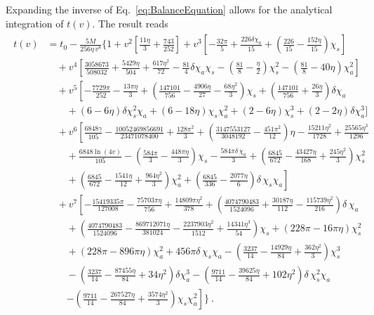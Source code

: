 Expanding the inverse of Eq.~\eqref{eq:BalanceEquation} allows for
the analytical integration of $t(v)$. The result reads
{\footnotesize
\begin{align} \label{eq:T2time}
\begin{split}
 t(v) &=  t_0 -  \frac{5M}{256 \eta \, v^8} \Bigg \{ 1 + v^2 \left[
\frac{11 \eta }{3}+\frac{743}{252} \right] + 
v^3 \left[ -\frac{32 \pi}{5} + \frac{226 \delta  \chi_a}{15} + \left(
 \frac{226}{15} -\frac{152 \eta}{15} \right) \chi_s
\right] \\
& \quad + v^4 \left[ 
\frac{3058673}{508032} + \frac{5429 \eta }{504} + \frac{617 \eta
^2}{72} -\frac{81}{4} \delta  \chi _a \chi _s
- \left(\frac{81}{8} - \frac{\eta}{2} \right) \chi_s^2 -
\left(\frac{81}{8} - 40 \eta \right)\chi _a^2 \right] \\
& \quad + v^5 \left[
-\frac{7729\pi }{252} - \frac{13 \pi  \eta }{3} + 
\left( \frac{147101}{756} -\frac{4906 \eta }{27}-\frac{68 \eta
^2}{3}\right) \chi_s
+ \left( \frac{147101
}{756} + \frac{26 \eta }{3} \right) \delta \chi_a \right. \\
& \qquad +  (6- 6\eta) \delta \chi_s^2 \chi_a + (6 - 18 \eta)
\chi_s \chi_a^2 + (2- 6 \eta) \chi_s^3 + (2 - 2\eta) \delta \chi_a^3 
\Bigg] \\
& \quad + v^6 \left[  \frac{6848\gamma}{105} -
\frac{10052469856691}{23471078400} +\frac{128 \pi ^2}{3}
+\left(\frac{3147553127 }{3048192} -\frac{451 \pi ^2}{12}
\right) \eta -\frac{15211 \eta ^2}{1728} + \frac{25565 \eta ^3}{1296} 
\right. \\
& \qquad  + \frac{6848 \ln (4v)}{105} - \left( \frac{584 \pi }{3} -
\frac{448 \pi  \eta }{3} \right) \chi_s -\frac{584 \pi  \delta \,
\chi_a }{3} + \left( \frac{6845}{672} -\frac{43427 \eta }{168} +
\frac{245 \eta ^2}{3} \right) \chi_s^2 \\
& \qquad + \left. \left(  \frac{6845}{672} -\frac{1541 \eta }{12} +
\frac{964 \eta ^2}{3} \right) \chi_a^2 
+ \left( \frac{6845}{336}-\frac{2077 \eta }{6} \right) \delta \,
\chi_s \chi_a
\right] \\
& \quad + v^7 \left[  -\frac{15419335 \pi }{127008} -\frac{75703 \pi 
\eta }{756} + \frac{14809 \pi  \eta ^2}{378} 
+ \left(\frac{4074790483}{1524096} +\frac{30187 \eta }{112}
-\frac{115739 \eta ^2}{216} \right) \delta \, \chi_a
\right. \\
& \qquad + \left( 
\frac{4074790483}{1524096} -\frac{869712071 \eta }{381024}
-\frac{2237903 \eta ^2}{1512} + \frac{14341 \eta ^3}{54}
\right) \chi_s + \left( 228 \pi -16 \pi  \eta \right) \chi_s^2 \\
& \qquad + \left( 228 \pi -896 \pi  \eta \right) \chi_a^2 + 456 \pi 
\delta \, \chi_s \chi_a - \left( \frac{3237}{14} - \frac{14929 \eta
}{84} +  \frac{362 \eta ^2}{3}\right) \chi_s^3 \\
& \qquad - \left( \frac{3237}{14} - \frac{87455 \eta }{84} + 34 \eta
^2 \right) \delta \chi_a^3 - \left( \frac{9711}{14} - \frac{39625 \eta
}{84} +  102 \eta ^2\right) \delta \, \chi_s^2 \chi_a \\
& \qquad \left . - \left(
\frac{9711}{14} -\frac{267527 \eta }{84} + \frac{3574 \eta
^2}{3} \right) \chi_s \chi_a^2 \right] \Bigg\}~.
\end{split}
\end{align}
}
